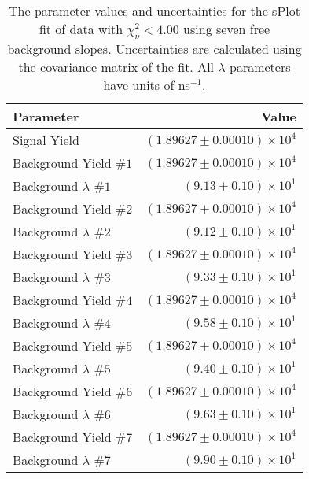 
\begin{table}[h]
    \begin{center}
        \begin{tabular}{lr}\toprule
            Parameter & Value \\\midrule
            Signal Yield & $(1.89627 \pm 0.00010) \times 10^{4}$ \\
            Background Yield $\#1$ & $(1.89627 \pm 0.00010) \times 10^{4}$ \\
            Background $\lambda$ $\#1$ & $(9.13 \pm 0.10) \times 10^{1}$ \\
            Background Yield $\#2$ & $(1.89627 \pm 0.00010) \times 10^{4}$ \\
            Background $\lambda$ $\#2$ & $(9.12 \pm 0.10) \times 10^{1}$ \\
            Background Yield $\#3$ & $(1.89627 \pm 0.00010) \times 10^{4}$ \\
            Background $\lambda$ $\#3$ & $(9.33 \pm 0.10) \times 10^{1}$ \\
            Background Yield $\#4$ & $(1.89627 \pm 0.00010) \times 10^{4}$ \\
            Background $\lambda$ $\#4$ & $(9.58 \pm 0.10) \times 10^{1}$ \\
            Background Yield $\#5$ & $(1.89627 \pm 0.00010) \times 10^{4}$ \\
            Background $\lambda$ $\#5$ & $(9.40 \pm 0.10) \times 10^{1}$ \\
            Background Yield $\#6$ & $(1.89627 \pm 0.00010) \times 10^{4}$ \\
            Background $\lambda$ $\#6$ & $(9.63 \pm 0.10) \times 10^{1}$ \\
            Background Yield $\#7$ & $(1.89627 \pm 0.00010) \times 10^{4}$ \\
            Background $\lambda$ $\#7$ & $(9.90 \pm 0.10) \times 10^{1}$ \\\bottomrule
        \end{tabular}
        \caption{The parameter values and uncertainties for the sPlot fit of data with $\chi^2_\nu < 4.00$ using seven free background slopes. Uncertainties are calculated using the covariance matrix of the fit. All $\lambda$ parameters have units of $\si{\nano\second}^{-1}$.}
    \end{center}
\end{table}
